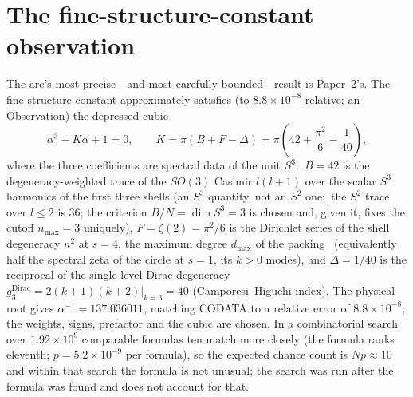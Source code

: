 \documentclass[aps,pra,twocolumn,superscriptaddress,longbibliography]{revtex4-2}
\newcommand{\gvc}[2]{#2}
\begin{document}
\section{The fine-structure-constant observation}\label{sec:alpha}

The arc's most precise---and most carefully bounded---result is
Paper~2's.  The fine-structure constant approximately satisfies (to
$8.8\times10^{-8}$ relative; an Observation) the depressed cubic
\begin{equation}
\alpha^3-K\alpha+1=0,\qquad
K=\pi\!\left(B+F-\Delta\right)
 =\pi\!\left(42+\frac{\pi^2}{6}-\frac{1}{40}\right),
\label{eq:K}
\end{equation}
where the three coefficients are spectral data of the unit $S^3$:\
$B=42$ is the degeneracy-weighted trace of the $SO(3)$ Casimir $l(l+1)$
over the scalar $S^3$ harmonics of the first three shells (an $S^3$
quantity, not an $S^2$ one:\ the $S^2$ trace over $l\le2$ is $36$; the
criterion $B/N=\dim S^3=3$ is chosen and, given it, fixes the cutoff
$n_{\max}=3$ uniquely), $F=\zeta(2)=\pi^2/6$ is the Dirichlet series of the
shell degeneracy $n^2$ at $s=4$, the maximum degree $d_{\max}$ of the
packing~\cite{loutey_paper0} (equivalently half the spectral zeta of the
circle at $s = 1$, its $k > 0$ modes), and $\Delta=1/40$ is the reciprocal
of the single-level Dirac degeneracy
$g_3^{\text{Dirac}}=2(k{+}1)(k{+}2)|_{k=3}=40$ (Camporesi--Higuchi index).
\gvc{k-match-precision}{The physical root gives $\alpha^{-1}=137.036011$, matching CODATA to a
relative error of $8.8\times10^{-8}$; the weights, signs, prefactor and
the cubic are chosen}.  In a
combinatorial search over $1.92\times10^9$ comparable formulas ten match
more closely (the formula ranks eleventh; $p = 5.2\times10^{-9}$ per
formula), so the expected chance count is $Np\approx10$ and within that
search the formula is not unusual; the search was run after the formula
was found and does not account for that.
\end{document}
